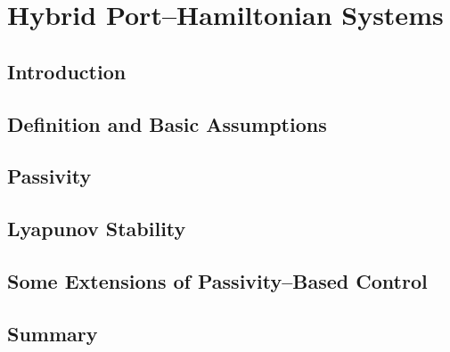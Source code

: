 \chapter{Hybrid Port--Hamiltonian Systems}

\label{chap:HPH_systems}
\minitoc

\thispagestyle{empty}

\newpage

\section{Introduction}

\clearpage

\section{Definition and Basic Assumptions}

\clearpage

\section{Passivity}

\clearpage
\section{Lyapunov Stability}

\clearpage

\section{Some Extensions of Passivity--Based Control}

\clearpage

\section{Summary}